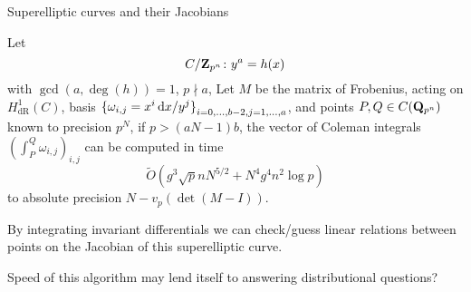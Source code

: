 \begin{frame}{Superelliptic curves and their Jacobians}
    \begin{theorem}
        Let \vspace{-13pt} $$ C/\mathbf{Z}_{p^n}\colon y^a = h(x)$$
        with $ \gcd(a,\deg(h)) = 1$, $ p\nmid a$, Let $ M$ be the matrix of Frobenius, acting on  $ H^1_\mathrm{dR}(C)$, basis $ {\{\omega_{i,j}= x^i\mathop{}\!\mathrm{d} x /y^j\}}_{i=0,\ldots, b-2,j=1,\ldots,a}$, and points $ P,Q\in C(\mathbf Q_{p^n})$ known to precision $ p^N$, if $ p \gt (aN - 1)b$, the vector of Coleman integrals $\left(\int_P^Q \omega_{i,j}\right)_{i,j}$ can be computed in time \vspace{-13pt}
        $$ \widetilde O\left(g^3 \sqrt{p}n N^{5/2} + N^4 g^4 n^2 \log p \right)$$
        to absolute precision  $ N - v_p(\det(M-I))$.
    \end{theorem}

    \pause%
    By integrating invariant differentials we can check/guess linear relations between points on the Jacobian of this superelliptic curve. \pause

    Speed of this algorithm may lend itself to answering distributional questions?

\end{frame}




